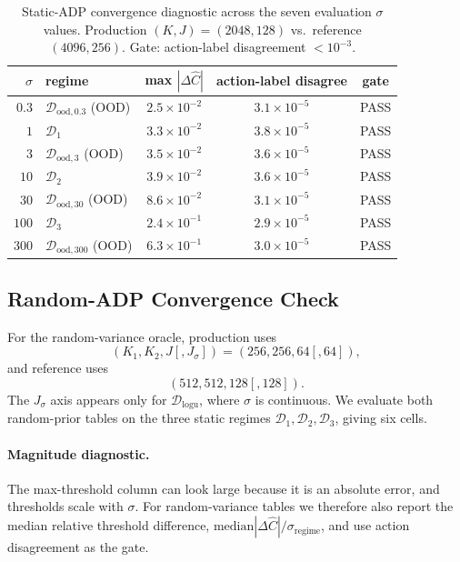 \documentclass[11pt]{article}
\begin{document}
\begin{table}[H]
\centering
\small
\begin{tabular}{rlccc}
\hline
$\sigma$ & regime & max $|\Delta \widehat C|$ & action-label disagree & gate \\
\hline
$0.3$  & $\mathcal{D}_{\mathrm{ood,0.3}}$ (OOD) & $2.5 \times 10^{-2}$ & $3.1 \times 10^{-5}$ & PASS \\
$1$    & $\mathcal{D}_1$                        & $3.3 \times 10^{-2}$ & $3.8 \times 10^{-5}$ & PASS \\
$3$    & $\mathcal{D}_{\mathrm{ood,3}}$ (OOD)   & $3.5 \times 10^{-2}$ & $3.6 \times 10^{-5}$ & PASS \\
$10$   & $\mathcal{D}_2$                        & $3.9 \times 10^{-2}$ & $3.6 \times 10^{-5}$ & PASS \\
$30$   & $\mathcal{D}_{\mathrm{ood,30}}$ (OOD)  & $8.6 \times 10^{-2}$ & $3.1 \times 10^{-5}$ & PASS \\
$100$  & $\mathcal{D}_3$                        & $2.4 \times 10^{-1}$ & $2.9 \times 10^{-5}$ & PASS \\
$300$  & $\mathcal{D}_{\mathrm{ood,300}}$ (OOD) & $6.3 \times 10^{-1}$ & $3.0 \times 10^{-5}$ & PASS \\
\hline
\end{tabular}
\caption{Static-ADP convergence diagnostic across the seven evaluation $\sigma$ values. Production $(K, J) = (2048, 128)$ vs.\ reference $(4096, 256)$. Gate: action-label disagreement $< 10^{-3}$.}
\label{tab:convergence-static}
\end{table}

\subsection{Random-ADP Convergence Check}
\label{app:convergence-random}

For the random-variance oracle, production uses
\[
(K_1,K_2,J[,J_\sigma])=(256,256,64[,64]),
\]
and reference uses
\[
(512,512,128[,128]).
\]
The \(J_\sigma\) axis appears only for \(\mathcal{D}_{\mathrm{logu}}\), where \(\sigma\) is continuous. We evaluate both random-prior tables on the three static regimes \(\mathcal{D}_1,\mathcal{D}_2,\mathcal{D}_3\), giving six cells.

\paragraph{Magnitude diagnostic.}
The max-threshold column can look large because it is an absolute error, and thresholds scale with \(\sigma\). For random-variance tables we therefore also report the median relative threshold difference, \(\mathrm{median}|\Delta\widehat C|/\sigma_{\mathrm{regime}}\), and use action disagreement as the gate.
\end{document}
